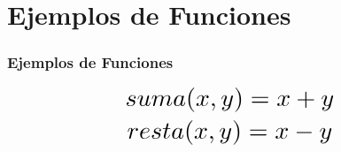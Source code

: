 \section{Ejemplos de Funciones}

\begin{frame}
\frametitle{Ejemplos de Funciones}

\[\Scale[2]{suma(x, y) = x + y}\]
\[\Scale[2]{resta(x, y) = x - y}\]

\end{frame}
